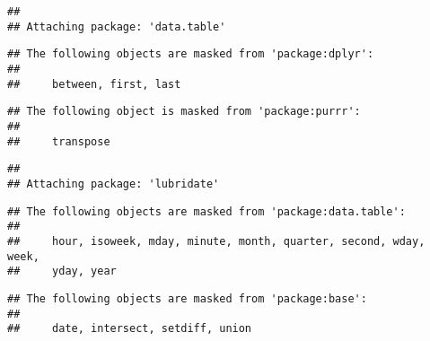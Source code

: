 \documentclass[
]{article}
\begin{document}
\begin{verbatim}
## 
## Attaching package: 'data.table'
\end{verbatim}

\begin{verbatim}
## The following objects are masked from 'package:dplyr':
## 
##     between, first, last
\end{verbatim}

\begin{verbatim}
## The following object is masked from 'package:purrr':
## 
##     transpose
\end{verbatim}

\begin{verbatim}
## 
## Attaching package: 'lubridate'
\end{verbatim}

\begin{verbatim}
## The following objects are masked from 'package:data.table':
## 
##     hour, isoweek, mday, minute, month, quarter, second, wday, week,
##     yday, year
\end{verbatim}

\begin{verbatim}
## The following objects are masked from 'package:base':
## 
##     date, intersect, setdiff, union
\end{verbatim}
\end{document}
